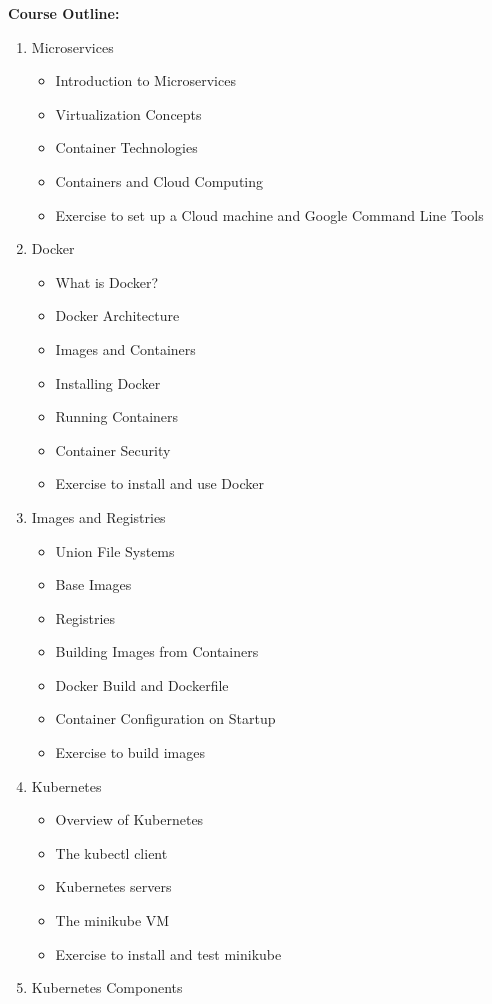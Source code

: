 \documentclass[a4paper,11pt]{article}
\begin{document}
\vspace{5mm}
\textbf {\large Course Outline:}
\begin{enumerate}
\item Microservices
\begin{itemize}
  \item Introduction to Microservices
  \item Virtualization Concepts
  \item Container Technologies
  \item Containers and Cloud Computing
  \item Exercise to set up a Cloud machine and Google Command Line Tools
\end{itemize}
\item Docker
\begin{itemize}
  \item What is Docker?
  \item Docker Architecture
  \item Images and Containers
  \item Installing Docker
  \item Running Containers
  \item Container Security
  \item Exercise to install and use Docker
\end{itemize}
\item Images and Registries
\begin{itemize}
  \item Union File Systems
  \item Base Images
  \item Registries
  \item Building Images from Containers
  \item Docker Build and Dockerfile
  \item Container Configuration on Startup
  \item Exercise to build images
\end{itemize}
\item Kubernetes
\begin{itemize}
  \item Overview of Kubernetes
  \item The kubectl client
  \item Kubernetes servers
  \item The minikube VM
  \item Exercise to install and test minikube
\end{itemize}
\item Kubernetes Components

\end{enumerate}
\end{document}
